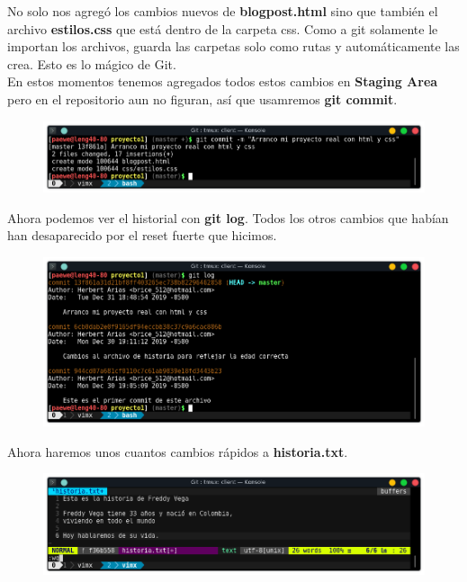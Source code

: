 \documentclass{article}
\begin{document}
No solo nos agregó los cambios nuevos de \textbf{blogpost.html} sino que
también el archivo \textbf{estilos.css} que está dentro de la carpeta css. Como
a git solamente le importan los archivos, guarda las carpetas solo como rutas y
automáticamente las crea. Esto es lo mágico de Git.\\

En estos momentos tenemos agregados todos estos cambios en \textbf{Staging
Area} pero en el repositorio aun no figuran, así que usamremos \textbf{git
commit}.

\begin{figure}[h!]
  \centering
  \includegraphics[scale=0.75]{./Pictures/114_commit.png}
\end{figure}

Ahora podemos ver el historial con \textbf{git log}. Todos los otros cambios
que habían han desaparecido por el reset fuerte que hicimos.

\newpage

\begin{figure}[h!]
  \centering
  \includegraphics[scale=0.75]{./Pictures/115_log.png}
\end{figure}

Ahora haremos unos cuantos cambios rápidos a \textbf{historia.txt}.

\begin{figure}[h!]
  \centering
  \includegraphics[scale=0.75]{./Pictures/116_historia_changed.png}
\end{figure}
\end{document}
